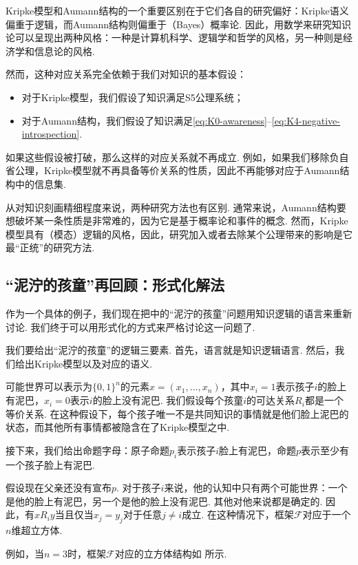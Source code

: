 Kripke模型和Aumann结构的一个重要区别在于它们各自的研究偏好：Kripke语义偏重于逻辑，而Aumann结构则偏重于（Bayes）概率论. 因此，用数学来研究知识论可以呈现出两种风格：一种是计算机科学、逻辑学和哲学的风格，另一种则是经济学和信息论的风格. 

然而，这种对应关系完全依赖于我们对知识的基本假设：
\begin{itemize}
    \item 对于Kripke模型，我们假设了知识满足S5公理系统；
    \item 对于Aumann结构，我们假设了知识满足\eqref{eq:K0-awareness}--\eqref{eq:K4-negative-introspection}. 
\end{itemize}
如果这些假设被打破，那么这样的对应关系就不再成立. 例如，如果我们移除负自省公理，Kripke模型就不再具备等价关系的性质，因此不再能够对应于Aumann结构中的信息集. 

从对知识刻画精细程度来说，两种研究方法也有区别. 通常来说，Aumann结构要想破坏某一条性质是非常难的，因为它是基于概率论和事件的概念. 然而，Kripke模型具有（模态）逻辑的风格，因此，研究加入或者去除某个公理带来的影响是它最“正统”的研究方法. 


\subsection{“泥泞的孩童”再回顾：形式化解法}

作为一个具体的例子，我们现在把中的“泥泞的孩童”问题用知识逻辑的语言来重新讨论. 我们终于可以用形式化的方式来严格讨论这一问题了. 

我们要给出“泥泞的孩童”的逻辑三要素. 首先，语言就是知识逻辑语言. 然后，我们给出Kripke模型以及对应的语义. 

可能世界可以表示为$\{0,1\}^n$的元素$x=(x_1,\dots,x_n)$，其中$x_i=1$表示孩子$i$的脸上有泥巴，$x_i=0$表示$i$的脸上没有泥巴. 我们假设每个孩童$i$的可达关系$R_i$都是一个等价关系. 在这种假设下，每个孩子唯一不是共同知识的事情就是他们脸上泥巴的状态，而其他所有事情都被隐含在了Kripke模型之中. 

接下来，我们给出命题字母：原子命题$p_i$表示孩子$i$脸上有泥巴，命题$p$表示至少有一个孩子脸上有泥巴. 

假设现在父亲还没有宣布$p$. 对于孩子$i$来说，他的认知中只有两个可能世界：一个是他的脸上有泥巴，另一个是他的脸上没有泥巴. 其他对他来说都是确定的. 因此，有$x R_i y$当且仅当$x_j=y_j$对于任意$j\neq i$成立. 在这种情况下，框架$\mathcal{F}$对应于一个$n$维超立方体. 

例如，当$n=3$时，框架$\mathcal{F}$对应的立方体结构如 所示. 

